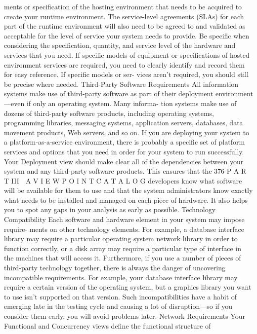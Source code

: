 ments or specification of the hosting environment that needs to be acquired to
create your runtime environment. The service-level agreements (SLAs) for each
part of the runtime environment will also need to be agreed to and validated as
acceptable for the level of service your system needs to provide.
Be specific when considering the specification, quantity, and service level
of the hardware and services that you need. If specific models of equipment or
specifications of hosted environment services are required, you need to
clearly identify and record them for easy reference. If specific models or ser-
vices aren’t required, you should still be precise where needed.
Third-Party Software Requirements
All information systems make use of third-party software as part of their
deployment environment—even if only an operating system. Many informa-
tion systems make use of dozens of third-party software products, including
operating systems, programming libraries, messaging systems, application
servers, databases, data movement products, Web servers, and so on. If you
are deploying your system to a platform-as-a-service environment, there is
probably a specific set of platform services and options that you need in order
for your system to run successfully.
Your Deployment view should make clear all of the dependencies between
your system and any third-party software products. This ensures that the
376
 P A R T III  A V I E W P O I N T C A T A L O G
developers know what software will be available for them to use and that the
system administrators know exactly what needs to be installed and managed
on each piece of hardware. It also helps you to spot any gaps in your analysis
as early as possible.
Technology Compatibility
Each software and hardware element in your system may impose require-
ments on other technology elements. For example, a database interface library
may require a particular operating system network library in order to function
correctly, or a disk array may require a particular type of interface in the
machines that will access it.
Furthermore, if you use a number of pieces of third-party technology
together, there is always the danger of uncovering incompatible requirements.
For example, your database interface library may require a certain version of
the operating system, but a graphics library you want to use isn’t supported
on that version. Such incompatibilities have a habit of emerging late in the
testing cycle and causing a lot of disruption—so if you consider them early,
you will avoid problems later.
Network Requirements
Your Functional and Concurrency views define the functional structure of
